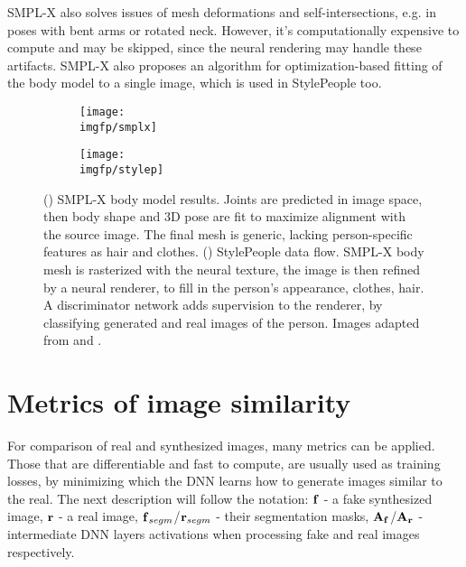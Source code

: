 SMPL-X also solves issues of mesh deformations and self-intersections, e.g. in poses with bent arms or rotated neck. However, it's computationally expensive to compute and may be skipped, since the neural rendering may handle these artifacts. SMPL-X also proposes an algorithm for optimization-based fitting of the body model to a single image, which is used in StylePeople too. 

\begin{figure}[h!]
	\centering
	\begin{subfigure}[b]{0.39\textwidth}
		\centering
		\texttt{[image: \\imgfp/smplx]}
		\caption{}
		\label{lit:fig:smplx}
	\end{subfigure}
	\hfill
	\begin{subfigure}[b]{0.60\textwidth}
		\centering
		\texttt{[image: \\imgfp/stylep]}
		\caption{}
		\label{lit:fig:stylepeople}
	\end{subfigure}
	\label{lit:fig:avatars}
	\caption{(\protect{}) SMPL-X body model results. Joints are predicted in image space, then body shape and 3D pose are fit to maximize alignment with the source image. The final mesh is generic, lacking person-specific features as hair and clothes. (\protect{}) StylePeople data flow. SMPL-X body mesh is rasterized with the neural texture, the image is then refined by a neural renderer, to fill in the person's appearance, clothes, hair. A discriminator network adds supervision to the renderer, by classifying generated and real images of the person. Images adapted from \cite{dnn:smplx19} and \cite{dnn:stylepeople21}.}
\end{figure}

\section{Metrics of image similarity}
\label{lit:metrics}

For comparison of real and synthesized images, many metrics can be applied. Those that are differentiable and fast to compute, are usually used as training losses, by minimizing which the DNN learns how to generate images similar to the real. The next description will follow the notation: $\bm{\mathrm{f}}$ - a fake synthesized image, $\bm{\mathrm{r}}$ - a real image, $\bm{\mathrm{f}}_{segm}$/$\bm{\mathrm{r}}_{segm}$ - their segmentation masks, $\bm{\mathrm{A_f}}$/$\bm{\mathrm{A_r}}$ - intermediate DNN layers activations when processing fake and real images respectively.

